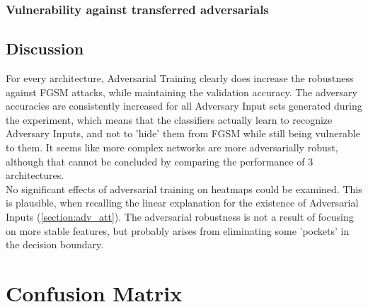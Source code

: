 \documentclass[draft,final]{vutinfth} %
\begin{document}
\subsection{Vulnerability against transferred adversarials}

\begin{table}[h]
	\noindent{}
		\caption{Accuracies on transferred adversarial examples}
\end{table}

\section{Discussion}

For every architecture, Adversarial Training clearly does increase the robustness against FGSM attacks, while maintaining the validation accuracy.
The adversary accuracies are consistently increased for all Adversary Input sets generated during the experiment, which means that the classifiers actually learn to recognize
Adversary Inputs, and not to 'hide' them from FGSM while still being vulnerable to them.
It seems like more complex networks are more adversarially robust, although that cannot be concluded by comparing the performance of 3 architectures.\\

No significant effects of adversarial training on heatmaps could be examined.
This is plausible, when recalling the linear explanation for the existence of Adversarial Inputs (\ref{section:adv_att}).
The adversarial robustness is not a result of focusing on more stable features, but probably arises from eliminating some 'pockets' in the decision boundary.


\chapter{Confusion Matrix}
\end{document}
